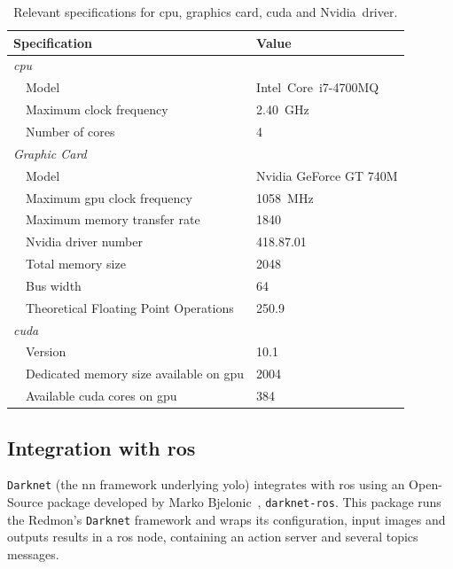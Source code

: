 \begin{table}[!ht]
	\renewcommand{\arraystretch}{1.2}
	\centering
	\begin{tabular}{@{}lp{7cm}l@{}}
		\toprule
		\multicolumn{2}{l}{Specification} & Value \\ \midrule
		\multicolumn{2}{l}{\emph{\ac{cpu}}} & \\
		\phantom{a} & Model   & Intel\cp~Core\texttrademark~i7-4700MQ \\
								& Maximum clock frequency & \SI{2.40}{\giga\hertz} \\
								& Number of cores & 4 \\ 
		\midrule
		\multicolumn{2}{l}{\emph{Graphic Card}} & \\
		\phantom{a} & Model   & Nvidia GeForce GT 740M \\
								& Maximum \ac{gpu} clock frequency & \SI{1058}{\mega\hertz} \\
								&	Maximum memory transfer rate & \SI{1840}{\mega\byte} \\
								&	Nvidia driver number & 418.87.01 \\
								& Total memory size & \SI{2048}{\mega\byte} \\
								& Bus width & \SI{64}{\bytes} \\
								& Theoretical Floating Point Operations & \SI{250.9}{\giga\flops} \\
		\midrule 
		\multicolumn{2}{l}{\emph{\ac{cuda}\texttrademark}} \\
								&	Version & 10.1 \\
								&	Dedicated memory size available on \ac{gpu}& \SI{2004}{\mega\byte} \\
								& Available \ac{cuda} cores on \ac{gpu} & 384 \\
		\bottomrule
	\end{tabular}
	\caption[Relevant specifications for \acs{cpu}, graphics card, \acs{cuda} and Nvidia\texttrademark~driver.]{Relevant specifications for \ac{cpu}, graphics card, \ac{cuda} and Nvidia\texttrademark~driver.}
	\label{tab:computer-specs}
\end{table}


\subsection{Integration with \acs{ros}}
\texttt{Darknet} (the \ac{nn} framework underlying \ac{yolo}) integrates with \ac{ros} using an Open-Source package developed by Marko Bjelonic~\cite{MarkoBjelonic}, \texttt{darknet-ros}. This package runs the Redmon's \texttt{Darknet} framework and wraps its configuration, input images and outputs results in a \ac{ros} node, containing an action server and several topics messages.

